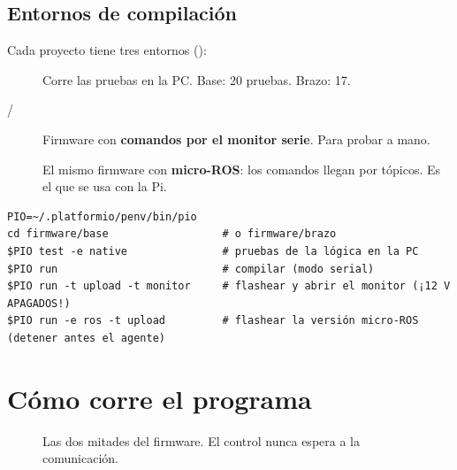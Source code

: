 \subsection{Entornos de compilación}
Cada proyecto tiene tres entornos ():
\begin{description}
  \item[] Corre las pruebas en la PC. Base: 20 pruebas. Brazo: 17.
  \item[ / ] Firmware con \textbf{comandos por el monitor serie}. Para probar a mano.
  \item[] El mismo firmware con \textbf{micro-ROS}: los comandos llegan por tópicos. Es el que se usa con la Pi.
\end{description}

\begin{lstlisting}[language=consola]
PIO=~/.platformio/penv/bin/pio
cd firmware/base                  # o firmware/brazo
$PIO test -e native               # pruebas de la lógica en la PC
$PIO run                          # compilar (modo serial)
$PIO run -t upload -t monitor     # flashear y abrir el monitor (¡12 V APAGADOS!)
$PIO run -e ros -t upload         # flashear la versión micro-ROS (detener antes el agente)
\end{lstlisting}

\section{Cómo corre el programa}

\begin{figure}[H]
\centering
{}
\caption{Las dos mitades del firmware. El control nunca espera a la comunicación.}
\end{figure}

